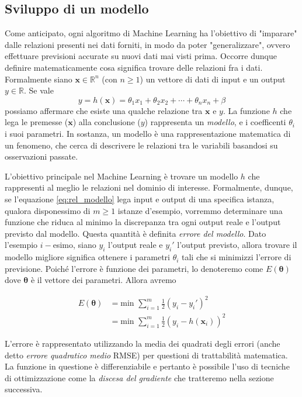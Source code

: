 \documentclass[12pt,a4paper,twoside,openright]{book}
\begin{document}
\subsection{Sviluppo di un modello}

Come anticipato, ogni algoritmo di Machine Learning ha l'obiettivo di "imparare" dalle relazioni presenti nei dati forniti, in modo da poter "generalizzare", ovvero effettuare previsioni accurate su nuovi dati mai visti prima.
Occorre dunque definire matematicamente cosa significa trovare delle relazioni fra i dati. Formalmente siano $\mathbf{x} \in \mathbb{R}^n$ (con $n \geq 1$) un vettore di dati di input e un output $y \in \mathbb{R}$. Se vale
\begin{equation}\label{eq:rel_modello}
    y = h(\mathbf{x}) = \theta_1 x_1 + \theta_2 x_2 + \cdots + \theta_n x_n + \beta
\end{equation}
possiamo affermare che esiste una qualche relazione tra $\mathbf{x}$ e $y$.
La funzione $h$ che lega le premesse ($\mathbf{x}$) alla conclusione ($y$) rappresenta un \emph{modello}, e i coefficenti $\theta_i$ i suoi parametri. 
In sostanza, un modello è una rappresentazione matematica di un fenomeno, che cerca di descrivere le relazioni tra le variabili basandosi su osservazioni passate.

L'obiettivo principale nel Machine Learning è trovare un modello $h$ che rappresenti al meglio le relazioni nel dominio di interesse. Formalmente, dunque, se l'equazione \ref{eq:rel_modello} lega input e output di una specifica istanza, qualora disponessimo di $m \geq 1$ istanze d'esempio, vorremmo determinare una funzione che riduca al minimo la discrepanza tra ogni output reale e l'output previsto dal modello. Questa quantità è definita \emph{errore del modello}.
Dato l'esempio $i-$esimo, siano $y_i$ l'output reale e $y_i'$ l'output previsto, allora trovare il modello migliore significa ottenere i parametri $\theta_i$ tali che si minimizzi l'errore di previsione.
Poiché l'errore è funzione dei parametri, lo denoteremo come $E(\mathbf{\theta})$ dove $\mathbf{\theta}$ è il vettore dei parametri. Allora avremo

\begin{align*}
    E(\mathbf{\theta}) &=\text{min } \sum_{i=1}^m \frac{1}{2}(y_i - y_i')^2 \\
    &=\text{min } \sum_{i=1}^m \frac{1}{2}\left(y_i - h\left(\mathbf{x}_i\right)\right)^2
\end{align*}

L'errore è rappresentato utilizzando la media dei quadrati degli errori (anche detto \emph{errore quadratico medio} RMSE) per questioni di trattabilità matematica. La funzione in questione è differenziabile e pertanto è possibile l'uso di tecniche di ottimizzazione come la \emph{discesa del gradiente} che tratteremo nella sezione successiva.
\end{document}
